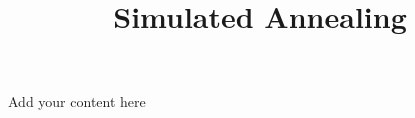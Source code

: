 \title{Simulated Annealing}
\label{chp:simulated-annealing}
\author{}
\institute{}
\maketitle



Add your content here




